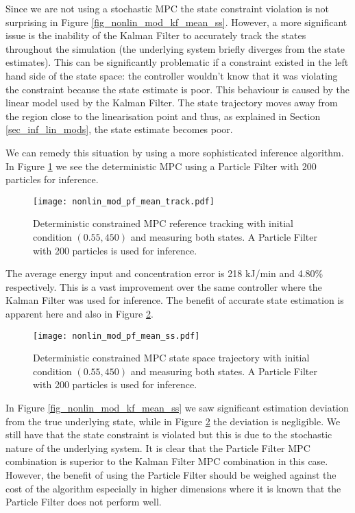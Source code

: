 Since we are not using a stochastic MPC the state constraint violation is not surprising in Figure \ref{fig_nonlin_mod_kf_mean_ss}. However, a more significant issue is the inability of the Kalman Filter to accurately track the states throughout the simulation (the underlying system briefly diverges from the state estimates). This can be significantly problematic if a constraint existed in the left hand side of the state space: the controller wouldn't know that it was violating the constraint because the state estimate is poor. This behaviour is caused by the linear model used by the Kalman Filter. The state trajectory moves away from the region close to the linearisation point and thus, as explained in Section \ref{sec_inf_lin_mods}, the state estimate becomes poor.

We can remedy this situation by using a more sophisticated inference algorithm. In Figure \ref{fig_nonlin_mod_pf_mean_track} we see the deterministic MPC using a Particle Filter with 200 particles for inference. 
\begin{figure}[H] 
\centering
\texttt{[image: nonlin\_mod\_pf\_mean\_track.pdf]}
\caption{Deterministic constrained MPC reference tracking with initial condition $(0.55, 450)$ and measuring both states. A Particle Filter with 200 particles is used for inference.}
\label{fig_nonlin_mod_pf_mean_track}
\end{figure} 
The average energy input and concentration error is 218 kJ/min and 4.80\% respectively. This is a vast improvement over the same controller where the Kalman Filter was used for inference. The benefit of accurate state estimation is apparent here and also in Figure \ref{fig_nonlin_mod_pf_mean_ss}.
\begin{figure}[H] 
\centering
\texttt{[image: nonlin\_mod\_pf\_mean\_ss.pdf]}
\caption{Deterministic constrained MPC state space trajectory with initial condition $(0.55, 450)$ and measuring both states. A Particle Filter with 200 particles is used for inference.}
\label{fig_nonlin_mod_pf_mean_ss}
\end{figure}
In Figure \ref{fig_nonlin_mod_kf_mean_ss} we saw significant estimation deviation from the true underlying state, while in Figure \ref{fig_nonlin_mod_pf_mean_ss} the deviation is negligible. We still have that the state constraint is violated but this is due to the stochastic nature of the underlying system. It is clear that the Particle Filter MPC combination is superior to the Kalman Filter MPC combination in this case. However, the benefit of using the Particle Filter should be weighed against the cost of the algorithm especially in higher dimensions where it is known that the Particle Filter does not perform well.

